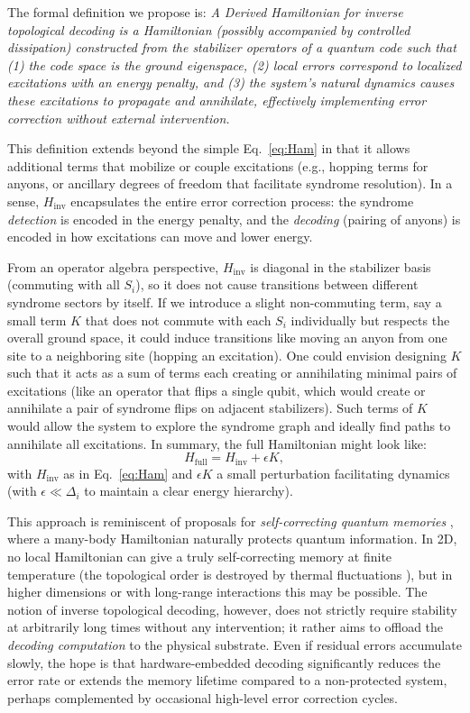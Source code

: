 \documentclass[11pt]{article}
\begin{document}
The formal definition we propose is: \emph{A Derived Hamiltonian for inverse topological decoding is a Hamiltonian (possibly accompanied by controlled dissipation) constructed from the stabilizer operators of a quantum code such that (1) the code space is the ground eigenspace, (2) local errors correspond to localized excitations with an energy penalty, and (3) the system's natural dynamics causes these excitations to propagate and annihilate, effectively implementing error correction without external intervention.}

This definition extends beyond the simple Eq.~\eqref{eq:Ham} in that it allows additional terms that mobilize or couple excitations (e.g., hopping terms for anyons, or ancillary degrees of freedom that facilitate syndrome resolution). In a sense, $H_{\mathrm{inv}}$ encapsulates the entire error correction process: the syndrome \emph{detection} is encoded in the energy penalty, and the \emph{decoding} (pairing of anyons) is encoded in how excitations can move and lower energy.

From an operator algebra perspective, $H_{\mathrm{inv}}$ is diagonal in the stabilizer basis (commuting with all $S_i$), so it does not cause transitions between different syndrome sectors by itself. If we introduce a slight non-commuting term, say a small term $K$ that does not commute with each $S_i$ individually but respects the overall ground space, it could induce transitions like moving an anyon from one site to a neighboring site (hopping an excitation). One could envision designing $K$ such that it acts as a sum of terms each creating or annihilating minimal pairs of excitations (like an operator that flips a single qubit, which would create or annihilate a pair of syndrome flips on adjacent stabilizers). Such terms of $K$ would allow the system to explore the syndrome graph and ideally find paths to annihilate all excitations. In summary, the full Hamiltonian might look like:
\begin{equation}
    H_{\text{full}} = H_{\mathrm{inv}} + \epsilon K, 
\end{equation}
with $H_{\mathrm{inv}}$ as in Eq.~\eqref{eq:Ham} and $\epsilon K$ a small perturbation facilitating dynamics (with $\epsilon \ll \Delta_i$ to maintain a clear energy hierarchy).

This approach is reminiscent of proposals for \textit{self-correcting quantum memories} \cite{Terhal2015}, where a many-body Hamiltonian naturally protects quantum information. In 2D, no local Hamiltonian can give a truly self-correcting memory at finite temperature (the topological order is destroyed by thermal fluctuations \cite{Alicki2009}), but in higher dimensions or with long-range interactions this may be possible. The notion of inverse topological decoding, however, does not strictly require stability at arbitrarily long times without any intervention; it rather aims to offload the \emph{decoding computation} to the physical substrate. Even if residual errors accumulate slowly, the hope is that hardware-embedded decoding significantly reduces the error rate or extends the memory lifetime compared to a non-protected system, perhaps complemented by occasional high-level error correction cycles.
\end{document}
